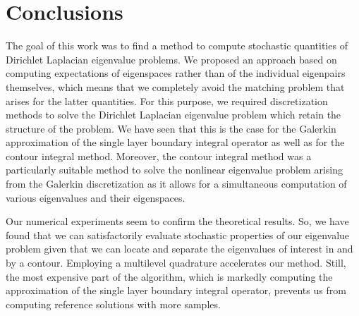 \chapter{Conclusions}\label{chapter:conclusions}
The goal of this work was to find a method to compute stochastic quantities of Dirichlet Laplacian eigenvalue problems.
We proposed an approach based on computing expectations of eigenspaces rather than of the individual eigenpairs themselves, which means that we completely avoid the matching problem that arises for the latter quantities.
For this purpose, we required discretization methods to solve the Dirichlet Laplacian eigenvalue problem which retain the structure of the problem.
We have seen that this is the case for the Galerkin approximation of the single layer boundary integral operator as well as for the contour integral method.
Moreover, the contour integral method was a particularly suitable method to solve the nonlinear eigenvalue problem arising from the Galerkin discretization as it allows for a simultaneous computation of various eigenvalues and their eigenspaces.

Our numerical experiments seem to confirm the theoretical results.
So, we have found that we can satisfactorily evaluate stochastic properties of our eigenvalue problem given that we can locate and separate the eigenvalues of interest in and by a contour.
Employing a multilevel quadrature accelerates our method.
Still, the most expensive part of the algorithm, which is markedly computing the approximation of the single layer boundary integral operator, prevents us from computing reference solutions with more samples.